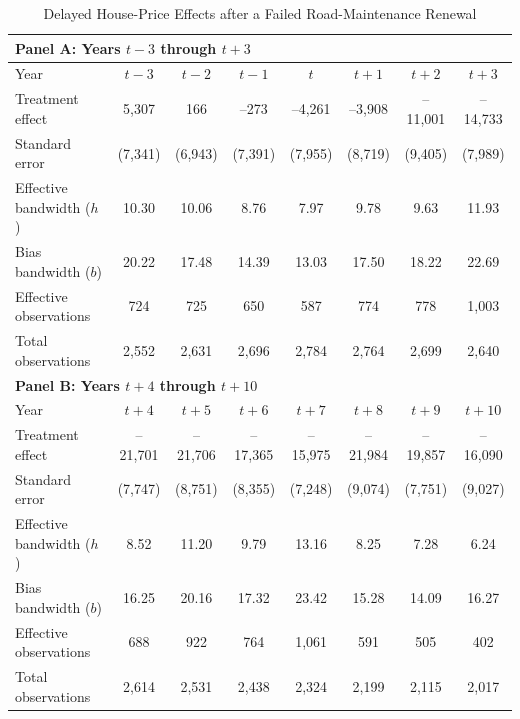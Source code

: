 \begin{table}[H]
  \centering
  \caption{Delayed House-Price Effects after a Failed Road-Maintenance Renewal}
  \label{tab:median_sale_amount}
  \begin{threeparttable}

    \begin{tabular}{p{4.5cm}ccccccc}
    \toprule
    \multicolumn{8}{l}{\textbf{Panel A: Years $t-3$ through $t+3$}}\\
    \midrule
    Year       & $t\!-\!3$ & $t\!-\!2$ & $t\!-\!1$ & $t$ & $t\!+\!1$ & $t\!+\!2$ & $t\!+\!3$\\
    \midrule
    Treatment effect           &  5,307 &     166 &    –273 &  –4,261 &  –3,908 & –11,001 & –14,733 \\
    Standard error             & (7,341)& (6,943)& (7,391) & (7,955) & (8,719) & (9,405) & (7,989) \\
    Effective bandwidth ($h$)  & 10.30  & 10.06 &  8.76  &  7.97  &  9.78  &  9.63  & 11.93  \\
    Bias bandwidth ($b$)       & 20.22  & 17.48 & 14.39  & 13.03  & 17.50  & 18.22  & 22.69  \\
    Effective observations     &   724  &   725  &   650  &   587  &   774  &   778  & 1,003  \\
    Total observations         & 2,552  & 2,631  & 2,696  & 2,784  & 2,764  & 2,699  & 2,640  \\
    \midrule
    \multicolumn{8}{l}{\textbf{Panel B: Years $t+4$ through $t+10$}}\\
    \midrule
    Year       & $t\!+\!4$ & $t\!+\!5$ & $t\!+\!6$ & $t\!+\!7$ & $t\!+\!8$ & $t\!+\!9$ & $t\!+\!10$\\
    \midrule
    Treatment effect           & –21,701 & –21,706 & –17,365 & –15,975 & –21,984 & –19,857 & –16,090 \\
    Standard error             &  (7,747)&  (8,751)&  (8,355)&  (7,248)&  (9,074)&  (7,751)&  (9,027) \\
    Effective bandwidth ($h$)  &   8.52 &  11.20 &   9.79 &  13.16 &   8.25 &   7.28 &   6.24 \\
    Bias bandwidth ($b$)       &  16.25 &  20.16 &  17.32 &  23.42 &  15.28 &  14.09 &  16.27 \\
    Effective observations     &    688 &    922 &    764 &  1,061 &    591 &    505 &    402 \\
    Total observations         &  2,614 &  2,531 &  2,438 &  2,324 &  2,199 &  2,115 &  2,017 \\

\end{tabular}
\end{threeparttable}
\end{table}
